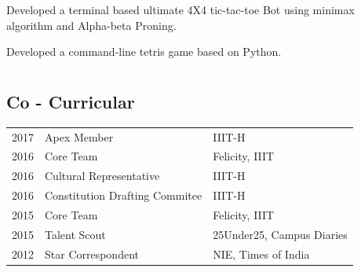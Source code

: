 \documentclass[]{deedy-resume-openfont}
\begin{document}
\begin{minipage}[t]{0.66\textwidth}
Developed a terminal based ultimate 4X4 tic-tac-toe Bot using minimax algorithm and Alpha-beta Proning.
\sectionsep

Developed a command-line tetris game based on Python.
\sectionsep







\section{}
\subsection{Co - Curricular}

\begin{tabular}{rll}
2017 	&Apex Member    &IIIT-H\\
2016     &Core Team  &Felicity, IIIT \\
2016    &Cultural Representative   &IIIT-H\\
2016   &Constitution Drafting Commitee  &IIIT-H\\
2015     &Core Team  &Felicity, IIIT \\
2015   &Talent Scout   &25Under25, Campus Diaries\\
2012   &Star Correspondent   &NIE, Times of India\\
\end{tabular}
\sectionsep

\end{minipage} 
\end{document}
